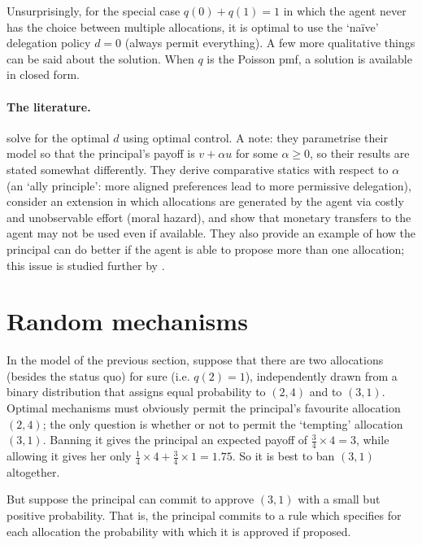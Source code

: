 Unsurprisingly, for the special case $q(0)+q(1)=1$ in which the agent never has the choice between multiple allocations,
it is optimal to use the `naïve' delegation policy $d = 0$ (always permit everything).
A few more qualitative things can be said about the solution. When $q$ is the Poisson pmf, a solution is available in closed form.


\paragraph{The literature.}
\textcite{ArmstrongVickers2010} solve for the optimal $d$ using optimal control.
A note: they parametrise their model so that the principal's payoff is $v + \alpha u$ for some $\alpha \geq 0$, so their results are stated somewhat differently.
They derive comparative statics with respect to $\alpha$ (an `ally principle': more aligned preferences lead to more permissive delegation),
consider an extension in which allocations are generated by the agent via costly and unobservable effort (moral hazard),
and show that monetary transfers to the agent may not be used even if available.
They also provide an example of how the principal can do better if the agent is able to propose more than one allocation; this issue is studied further by \textcite{GuoShmaya2021}.



\section{Random mechanisms}
\label{sec:ch4:random}

In the model of the previous section,
suppose that there are two allocations (besides the status quo) for sure (i.e. $q(2)=1$), independently drawn from a binary distribution
that assigns equal probability to $(2,4)$ and to $(3,1)$.
Optimal mechanisms must obviously permit the principal's favourite allocation $(2,4)$;
the only question is whether or not to permit the `tempting' allocation $(3,1)$.
Banning it gives the principal an expected payoff of $\frac{3}{4} \times 4 = 3$,
while allowing it gives her only $\frac{1}{4} \times 4 + \frac{3}{4} \times 1 = 1.75$.
So it is best to ban $(3,1)$ altogether.

But suppose the principal can commit to approve $(3,1)$ with a small but positive probability.
That is, the principal commits to a rule
which specifies for each allocation the probability with which it is approved if proposed.

